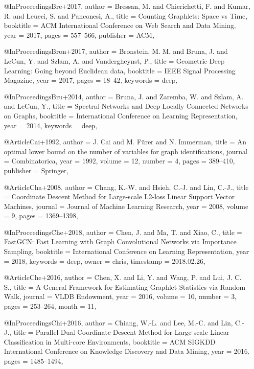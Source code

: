 @InProceedings{Bre+2017,
  author    = {Bressan, M. and Chierichetti, F. and Kumar, R. and Leucci, S. and Panconesi, A.},
  title     = {Counting Graphlets: Space vs Time},
  booktitle = {ACM International Conference on Web Search and Data Mining},
  year      = {2017},
  pages     = {557--566},
  publisher = {ACM},
}

@InProceedings{Bron+2017,
  author    = {Bronstein, M. M. and Bruna, J. and LeCun, Y. and Szlam, A. and Vandergheynst, P.},
  title     = {Geometric Deep Learning: Going beyond Euclidean data},
  booktitle = {{IEEE} Signal Processing Magazine},
  year      = {2017},
  pages     = {18--42},
  keywords  = {deep},
}

@InProceedings{Bru+2014,
  author    = {Bruna, J. and Zaremba, W. and Szlam, A. and LeCun, Y.},
  title     = {Spectral Networks and Deep Locally Connected Networks on Graphs},
  booktitle = {International Conference on Learning Representation},
  year      = {2014},
  keywords  = {deep},
}

@Article{Cai+1992,
  author    = {J. Cai and M. F{\"{u}}rer and N. Immerman},
  title     = {An optimal lower bound on the number of variables for graph identifications},
  journal   = {Combinatorica},
  year      = {1992},
  volume    = {12},
  number    = {4},
  pages     = {389--410},
  publisher = {Springer},
}

@Article{Cha+2008,
  author  = {Chang, K.-W. and Hsieh, C.-J. and Lin, C.-J.},
  title   = {Coordinate Descent Method for Large-scale L2-loss Linear Support Vector Machines},
  journal = {Journal of Machine Learning Research},
  year    = {2008},
  volume  = {9},
  pages   = {1369--1398},
}

@InProceedings{Che+2018,
  author    = {Chen, J. and Ma, T. and Xiao, C.},
  title     = {FastGCN: Fast Learning with Graph Convolutional Networks via Importance Sampling},
  booktitle = {International Conference on Learning Representation},
  year      = {2018},
  keywords  = {deep},
  owner     = {chris},
  timestamp = {2018.02.26},
}

@Article{Che+2016,
  author  = {Chen, X. and Li, Y. and Wang, P. and Lui, J. C. S.},
  title   = {A General Framework for Estimating Graphlet Statistics via Random Walk},
  journal = {VLDB Endowment},
  year    = {2016},
  volume  = {10},
  number  = {3},
  pages   = {253--264},
  month   = {11},
}

@InProceedings{Chi+2016,
  author    = {Chiang, W.-L. and Lee, M.-C. and Lin, C.-J.},
  title     = {Parallel Dual Coordinate Descent Method for Large-scale Linear Classification in Multi-core Environments},
  booktitle = {ACM SIGKDD International Conference on Knowledge Discovery and Data Mining},
  year      = {2016},
  pages     = {1485--1494},
}


